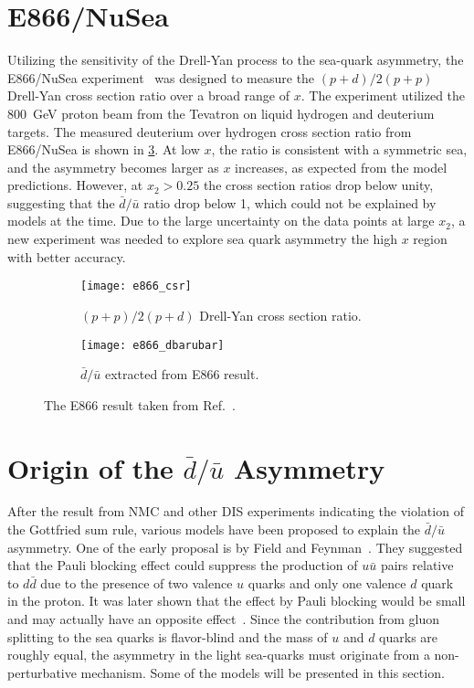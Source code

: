 \documentclass[../main.tex]{subfiles}
\begin{document}
\section{E866/NuSea}
\label{sec:E866}
Utilizing the sensitivity of the Drell-Yan process to the sea-quark asymmetry,
the E866/NuSea experiment~\cite{towell2001} was designed to measure the $(p+d)/2(p+p)$
Drell-Yan cross section ratio over a broad range of $x$. The
experiment utilized the \SI{800}{\GeV} proton beam from the Tevatron on liquid
hydrogen and deuterium targets. The measured deuterium over hydrogen cross section
ratio from E866/NuSea is shown in \cref{fig:e866_result}. At low $x$, the ratio is consistent
with a symmetric sea, and the asymmetry becomes larger as $x$ increases, as expected from
the model predictions. However, at $x_2>0.25$ the cross section ratios
drop below unity, suggesting that the $\bar{d}/\bar{u}$
ratio drop below 1, which could not be explained by models at the time.
Due to the large uncertainty on the data points at large $x_2$, a new
experiment was needed to explore sea quark asymmetry the high $x$ region with better
accuracy.
\begin{figure}[htbp!]
	\centering
	\begin{subfigure}{0.45\linewidth}
		\texttt{[image: e866\_csr]}
		\caption{$(p+p)/2(p+d)$ Drell-Yan cross section ratio.}
		\label{subfig:e866_csr}
	\end{subfigure}
	\begin{subfigure}{0.45\linewidth}
		\texttt{[image: e866\_dbarubar]}
		\caption{$\bar{d}/\bar{u}$ extracted from E866 result.}
		\label{subfig:e866_dbarubar}
	\end{subfigure}
	\caption{The E866 result taken from Ref.~\cite{towell2001}.}
	\label{fig:e866_result}
\end{figure}

\section{Origin of the \texorpdfstring{$\bar{d}/\bar{u}$}{dbar/ubar} Asymmetry }
After the result from NMC and other DIS experiments indicating the violation of the Gottfried sum rule,
various models have been proposed to explain the $\bar{d}/\bar{u}$ asymmetry. One of the early proposal
is by Field and Feynman~\cite{field1977}. They suggested that the Pauli blocking effect
could suppress the production of $u\bar{u}$ pairs relative to  $d\bar{d}$ due to the presence of two
valence $u$ quarks and only one valence $d$ quark in the proton.
It was later shown that the effect by Pauli blocking would be small and
may actually have an opposite effect~\cite{steffens1997}. Since the contribution from gluon splitting to the
sea quarks is flavor-blind and the mass of $u$ and $d$ quarks are roughly equal, the asymmetry in the
light sea-quarks must originate from a non-perturbative mechanism. Some of the models will be presented
in this section.
\end{document}

